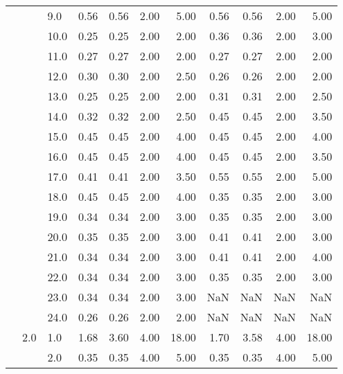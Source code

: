 \begin{tabular}{lllrrrrrrrr}
       &     & 9.0  &       0.56 &      0.56 & 2.00 &   5.00 &       0.56 &      0.56 & 2.00 &   5.00 \\
       &     & 10.0 &       0.25 &      0.25 & 2.00 &   2.00 &       0.36 &      0.36 & 2.00 &   3.00 \\
       &     & 11.0 &       0.27 &      0.27 & 2.00 &   2.00 &       0.27 &      0.27 & 2.00 &   2.00 \\
       &     & 12.0 &       0.30 &      0.30 & 2.00 &   2.50 &       0.26 &      0.26 & 2.00 &   2.00 \\
       &     & 13.0 &       0.25 &      0.25 & 2.00 &   2.00 &       0.31 &      0.31 & 2.00 &   2.50 \\
       &     & 14.0 &       0.32 &      0.32 & 2.00 &   2.50 &       0.45 &      0.45 & 2.00 &   3.50 \\
       &     & 15.0 &       0.45 &      0.45 & 2.00 &   4.00 &       0.45 &      0.45 & 2.00 &   4.00 \\
       &     & 16.0 &       0.45 &      0.45 & 2.00 &   4.00 &       0.45 &      0.45 & 2.00 &   3.50 \\
       &     & 17.0 &       0.41 &      0.41 & 2.00 &   3.50 &       0.55 &      0.55 & 2.00 &   5.00 \\
       &     & 18.0 &       0.45 &      0.45 & 2.00 &   4.00 &       0.35 &      0.35 & 2.00 &   3.00 \\
       &     & 19.0 &       0.34 &      0.34 & 2.00 &   3.00 &       0.35 &      0.35 & 2.00 &   3.00 \\
       &     & 20.0 &       0.35 &      0.35 & 2.00 &   3.00 &       0.41 &      0.41 & 2.00 &   3.00 \\
       &     & 21.0 &       0.34 &      0.34 & 2.00 &   3.00 &       0.41 &      0.41 & 2.00 &   4.00 \\
       &     & 22.0 &       0.34 &      0.34 & 2.00 &   3.00 &       0.35 &      0.35 & 2.00 &   3.00 \\
       &     & 23.0 &       0.34 &      0.34 & 2.00 &   3.00 &        NaN &       NaN &  NaN &    NaN \\
       &     & 24.0 &       0.26 &      0.26 & 2.00 &   2.00 &        NaN &       NaN &  NaN &    NaN \\
       & 2.0 & 1.0  &       1.68 &      3.60 & 4.00 &  18.00 &       1.70 &      3.58 & 4.00 &  18.00 \\
       &     & 2.0  &       0.35 &      0.35 & 4.00 &   5.00 &       0.35 &      0.35 & 4.00 &   5.00 \\

\end{tabular}
